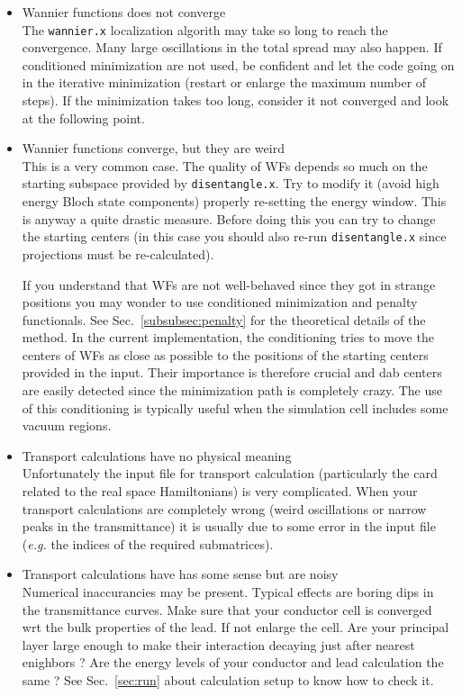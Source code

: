 \begin{itemize}
\item   {Wannier functions does not converge} \\
        The {\tt wannier.x} localization algorith may take so long to reach the 
        convergence. Many large oscillations in the total spread may also happen.
        If conditioned minimization are not used, be confident and let the code
        going on in the iterative minimization (restart or enlarge the maximum number
        of steps). If the minimization takes too long, consider it not converged and 
        look at the following point.

\item   {Wannier functions converge, but they are weird } \\
        This is a very common case. The quality of WFs depends so much on the starting
        subspace provided by {\tt disentangle.x}. Try to modify it (avoid high 
        energy Bloch state components) properly re-setting the energy window.
        This is anyway a quite drastic measure. Before doing this you can try to 
        change the starting centers (in this case you should also re-run 
        {\tt disentangle.x} since projections must be re-calculated). 

        If you understand that WFs are not well-behaved since they got in strange
        positions you may wonder to use conditioned minimization and penalty functionals. 
        See Sec.~\ref{subsubsec:penalty} for the theoretical details of the method.
        In the current implementation, the conditioning tries to move the centers of 
        WFs as close as possible to the positions of the starting centers provided
        in the input. Their importance is therefore crucial and dab centers are
        easily detected since the minimization path is completely crazy.
        The use of this conditioning is typically useful when the simulation cell 
        includes some vacuum regions. 

\item   {Transport calculations have no physical meaning } \\
        Unfortunately the input file for transport calculation (particularly the
        card related to the real space Hamiltonians) is very complicated.
        When your transport calculations are completely wrong (weird oscillations or 
        narrow peaks in the transmittance) it is usually due to some error in 
        the input file ({\it e.g.} the indices of the required submatrices). 

\item   {Transport calculations have has some sense but are noisy} \\
        Numerical inaccurancies may be present. Typical effects are boring dips 
        in the transmittance curves. Make sure that your conductor 
        cell is converged wrt the bulk properties of the lead. If not enlarge the cell.
        Are your principal layer large enough to make their interaction decaying
        just after nearest enighbors ?
        Are the energy levels of your conductor and lead calculation the same ?
        See Sec.~\ref{sec:run} about calculation setup to know how to check it.

\end{itemize}
